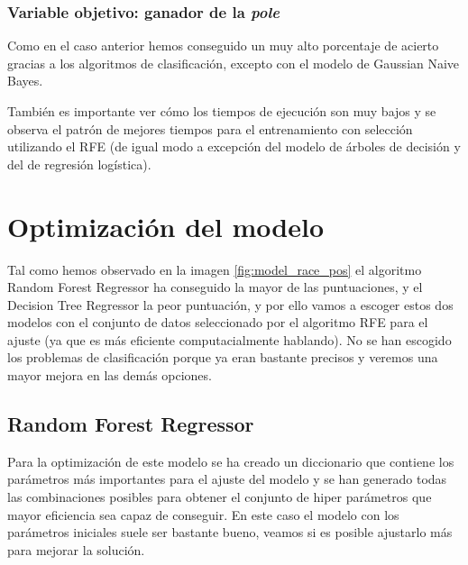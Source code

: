 
\subsubsection{Variable objetivo: ganador de la \textit{pole}}
Como en el caso anterior hemos conseguido un muy alto porcentaje de acierto gracias a los algoritmos de clasificación, excepto con el modelo de Gaussian Naive Bayes.

También es importante ver cómo los tiempos de ejecución son muy bajos y se observa el patrón de mejores tiempos para el entrenamiento con selección utilizando el RFE (de igual modo a excepción del modelo de árboles de decisión y del de regresión logística).


\section{Optimización del modelo}
Tal como hemos observado en la imagen \ref{fig:model_race_pos} el algoritmo Random Forest Regressor ha conseguido la mayor de las puntuaciones, y el Decision Tree Regressor la peor puntuación, y por ello vamos a escoger estos dos modelos con el conjunto de datos seleccionado por el algoritmo RFE para el ajuste (ya que es más eficiente computacialmente hablando). No se han escogido los problemas de clasificación porque ya eran bastante precisos y veremos una mayor mejora en las demás opciones. 

\subsection{Random Forest Regressor}
Para la optimización de este modelo se ha creado un diccionario que contiene los parámetros más importantes para el ajuste del modelo y se han generado todas las combinaciones posibles para obtener el conjunto de hiper parámetros que mayor eficiencia sea capaz de conseguir. En este caso el modelo con los parámetros iniciales suele ser bastante bueno, veamos si es posible ajustarlo más para mejorar la solución.

